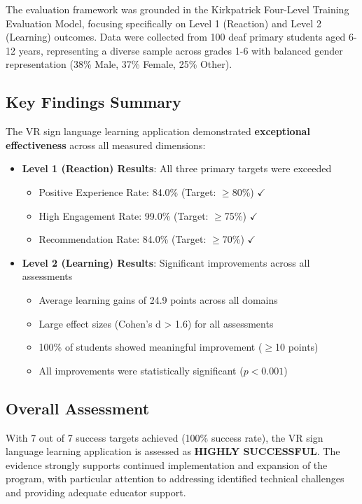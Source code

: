 \documentclass[12pt,a4paper]{article}
\begin{document}
The evaluation framework was grounded in the Kirkpatrick Four-Level Training Evaluation Model, focusing specifically on Level 1 (Reaction) and Level 2 (Learning) outcomes. Data were collected from 100 deaf primary students aged 6-12 years, representing a diverse sample across grades 1-6 with balanced gender representation (38\% Male, 37\% Female, 25\% Other).

\subsection{Key Findings Summary}

The VR sign language learning application demonstrated \textbf{exceptional effectiveness} across all measured dimensions:

\begin{itemize}
    \item \textbf{Level 1 (Reaction) Results}: All three primary targets were exceeded
    \begin{itemize}
        \item Positive Experience Rate: 84.0\% (Target: $\geq$80\%) $\checkmark$
        \item High Engagement Rate: 99.0\% (Target: $\geq$75\%) $\checkmark$
        \item Recommendation Rate: 84.0\% (Target: $\geq$70\%) $\checkmark$
    \end{itemize}
    
    \item \textbf{Level 2 (Learning) Results}: Significant improvements across all assessments
    \begin{itemize}
        \item Average learning gains of 24.9 points across all domains
        \item Large effect sizes (Cohen's d > 1.6) for all assessments
        \item 100\% of students showed meaningful improvement ($\geq$10 points)
        \item All improvements were statistically significant ($p < 0.001$)
    \end{itemize}
\end{itemize}

\subsection{Overall Assessment}

With 7 out of 7 success targets achieved (100\% success rate), the VR sign language learning application is assessed as \textbf{HIGHLY SUCCESSFUL}. The evidence strongly supports continued implementation and expansion of the program, with particular attention to addressing identified technical challenges and providing adequate educator support.
\end{document}
